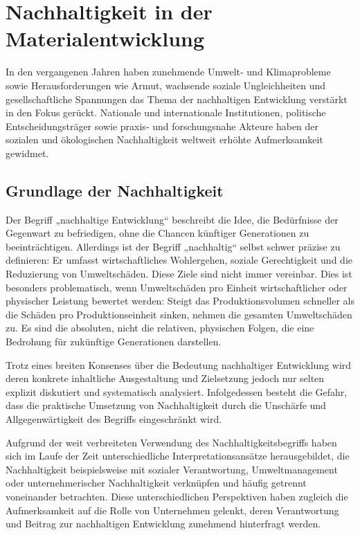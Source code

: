 \chapter{Nachhaltigkeit in der Materialentwicklung}

In den vergangenen Jahren haben zunehmende Umwelt‑ und Klimaprobleme sowie Herausforderungen wie Armut, wachsende soziale Ungleichheiten und gesellschaftliche Spannungen das Thema der nachhaltigen Entwicklung verstärkt in den Fokus gerückt. Nationale und internationale Institutionen, politische Entscheidungsträger sowie praxis‑ und forschungsnahe Akteure haben der sozialen und ökologischen Nachhaltigkeit weltweit erhöhte Aufmerksamkeit gewidmet. \cite{battilana2010building}


\section{Grundlage der Nachhaltigkeit}
Der Begriff „nachhaltige Entwicklung“ beschreibt die Idee, die Bedürfnisse der Gegenwart zu befriedigen, ohne die Chancen künftiger Generationen zu beeinträchtigen. Allerdings ist der Begriff „nachhaltig“ selbst schwer präzise zu definieren: Er umfasst wirtschaftliches Wohlergehen, soziale Gerechtigkeit und die Reduzierung von Umweltschäden. Diese Ziele sind nicht immer vereinbar. Dies ist besonders problematisch, wenn Umweltschäden pro Einheit wirtschaftlicher oder physischer Leistung bewertet werden: Steigt das Produktionsvolumen schneller als die Schäden pro Produktionseinheit sinken, nehmen die gesamten Umweltschäden zu. Es sind die absoluten, nicht die relativen, physischen Folgen, die eine Bedrohung für zukünftige Generationen darstellen. \cite{ashby2022materials}


Trotz eines breiten Konsenses über die Bedeutung nachhaltiger Entwicklung wird deren konkrete inhaltliche Ausgestaltung und Zielsetzung jedoch nur selten explizit diskutiert und systematisch analysiert. Infolgedessen besteht die Gefahr, dass die praktische Umsetzung von Nachhaltigkeit durch die Unschärfe und Allgegenwärtigkeit des Begriffs eingeschränkt wird. \cite{gray2010accounting}

Aufgrund der weit verbreiteten Verwendung des Nachhaltigkeitsbegriffs haben sich im Laufe der Zeit unterschiedliche Interpretationsansätze herausgebildet, die Nachhaltigkeit beispielsweise mit sozialer Verantwortung, Umweltmanagement oder unternehmerischer Nachhaltigkeit verknüpfen und häufig getrennt voneinander betrachten. Diese unterschiedlichen Perspektiven haben zugleich die Aufmerksamkeit auf die Rolle von Unternehmen gelenkt, deren Verantwortung und Beitrag zur nachhaltigen Entwicklung zunehmend hinterfragt werden. \cite{joseph2012ambiguous}

